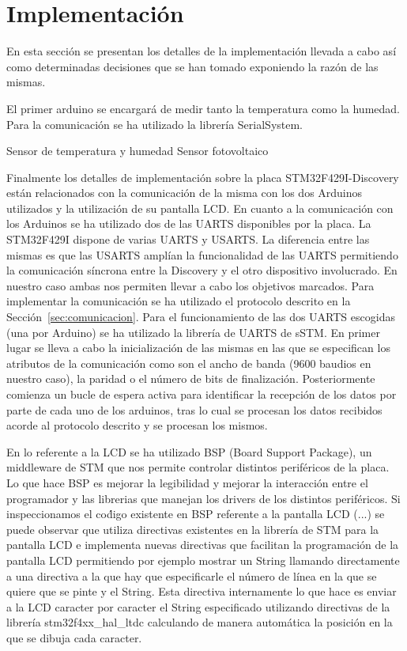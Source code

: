 \chapter{Implementaci\'on}\label{sec:imp}
En esta secci\'on se presentan los detalles de la implementaci\'on
llevada a cabo as\'i como determinadas decisiones que se han tomado
exponiendo la raz\'on de las mismas.

El primer arduino se encargar\'a de medir tanto la temperatura como la
humedad. Para la comunicaci\'on se ha utilizado la librer\'ia
SerialSystem. 

Sensor de temperatura y humedad
Sensor fotovoltaico

Finalmente los detalles de implementaci\'on sobre la placa
STM32F429I-Discovery est\'an relacionados con la comunicaci\'on de la
misma con los dos Arduinos utilizados y la utilizaci\'on de su
pantalla LCD. En cuanto a la comunicaci\'on con los Arduinos se ha
utilizado dos de las UARTS disponibles por la placa. La STM32F429I
dispone de varias UARTS y USARTS. La diferencia entre las mismas es
que las USARTS ampl\'ian la funcionalidad de las UARTS permitiendo la
comunicaci\'on s\'incrona entre la Discovery y el otro dispositivo
involucrado. En nuestro caso ambas nos permiten
llevar a cabo los objetivos marcados. Para implementar la
comunicaci\'on se ha utilizado el protocolo descrito en la
Secci\'on~\ref{sec:comunicacion}. Para el funcionamiento de las dos
UARTS escogidas (una por Arduino) se ha utilizado la librer\'ia de UARTS
de sSTM. En primer lugar se lleva a cabo la inicializaci\'on de las
mismas en las que se especifican los atributos de la comunicaci\'on
como son el ancho de banda (9600 baudios en nuestro caso), la paridad
o el n\'umero de bits de finalizaci\'on. Posteriormente comienza un
bucle de espera activa para identificar la recepci\'on de los datos
por parte de cada uno de los arduinos, tras lo cual se procesan los
datos recibidos acorde al protocolo descrito y se procesan los mismos.

En lo referente a la LCD se ha utilizado BSP (Board Support Package),
un middleware de STM que nos permite controlar distintos perif\'ericos
de la placa. Lo que hace BSP es mejorar la legibilidad y mejorar la
interacci\'on entre el programador y las librerias que manejan los
drivers de los distintos perif\'ericos. Si inspeccionamos el co\'digo
existente en BSP referente a la pantalla LCD (...) se puede observar
que utiliza directivas existentes en la librer\'ia de
STM para la pantalla LCD e implementa nuevas directivas que facilitan
la programaci\'on de la pantalla LCD permitiendo por ejemplo mostrar
un String llamando directamente a una directiva a la que hay que
especificarle el n\'umero de l\'inea en la que se quiere que se pinte
y el String. Esta directiva internamente lo que hace es enviar a la
LCD caracter por caracter el String especificado utilizando directivas
de la librer\'ia stm32f4xx_hal_ltdc calculando de manera autom\'atica la posici\'on en la
que se dibuja cada caracter.

